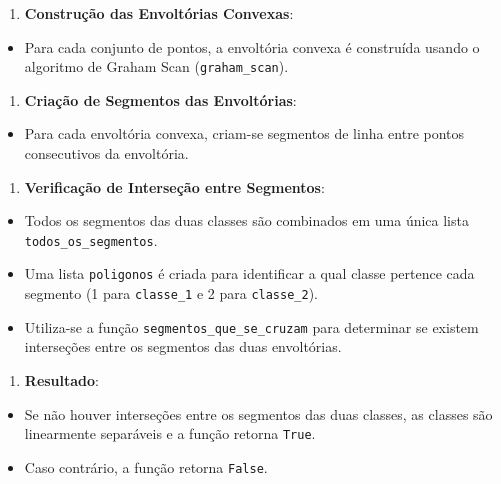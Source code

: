 \documentclass[11pt]{article}
\providecommand{\tightlist}{%
      \setlength{\itemsep}{0pt}\setlength{\parskip}{0pt}}
\begin{document}
\begin{enumerate}
\def\labelenumi{\arabic{enumi}.}
\tightlist
\item
  \textbf{Construção das Envoltórias Convexas}:
\end{enumerate}

\begin{itemize}
\tightlist
\item
  Para cada conjunto de pontos, a envoltória convexa é construída usando
  o algoritmo de Graham Scan (\texttt{graham\_scan}).
\end{itemize}

\begin{enumerate}
\def\labelenumi{\arabic{enumi}.}
\setcounter{enumi}{1}
\tightlist
\item
  \textbf{Criação de Segmentos das Envoltórias}:
\end{enumerate}

\begin{itemize}
\tightlist
\item
  Para cada envoltória convexa, criam-se segmentos de linha entre pontos
  consecutivos da envoltória.
\end{itemize}

\begin{enumerate}
\def\labelenumi{\arabic{enumi}.}
\setcounter{enumi}{2}
\tightlist
\item
  \textbf{Verificação de Interseção entre Segmentos}:
\end{enumerate}

\begin{itemize}
\tightlist
\item
  Todos os segmentos das duas classes são combinados em uma única lista
  \texttt{todos\_os\_segmentos}.
\item
  Uma lista \texttt{poligonos} é criada para identificar a qual classe
  pertence cada segmento (1 para \texttt{classe\_1} e 2 para
  \texttt{classe\_2}).
\item
  Utiliza-se a função \texttt{segmentos\_que\_se\_cruzam} para
  determinar se existem interseções entre os segmentos das duas
  envoltórias.
\end{itemize}

\begin{enumerate}
\def\labelenumi{\arabic{enumi}.}
\setcounter{enumi}{3}
\tightlist
\item
  \textbf{Resultado}:
\end{enumerate}

\begin{itemize}
\tightlist
\item
  Se não houver interseções entre os segmentos das duas classes, as
  classes são linearmente separáveis e a função retorna \texttt{True}.
\item
  Caso contrário, a função retorna \texttt{False}.
\end{itemize}
\end{document}
